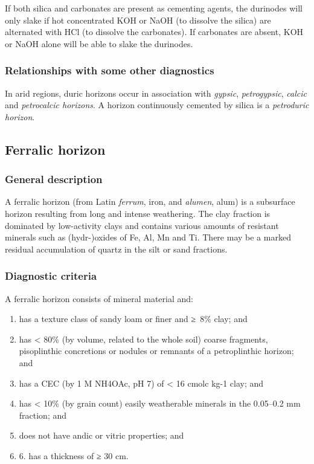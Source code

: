 \documentclass[
  letterpaper,
  DIV=11,
  numbers=noendperiod]{scrreprt}
\providecommand{\tightlist}{%
  \setlength{\itemsep}{0pt}\setlength{\parskip}{0pt}}\usepackage{longtable,booktabs,array}
\begin{document}
If both silica and carbonates are present as cementing agents, the
durinodes will only slake if hot concentrated KOH or NaOH (to dissolve
the silica) are alternated with HCl (to dissolve the carbonates). If
carbonates are absent, KOH or NaOH alone will be able to slake the
durinodes.

\hypertarget{relationships-with-some-other-diagnostics-8}{%
\subsubsection{Relationships with some other
diagnostics}\label{relationships-with-some-other-diagnostics-8}}

In arid regions, duric horizons occur in association with \emph{gypsic},
\emph{petrogypsic}, \emph{calcic} and \emph{petrocalcic horizons}. A
horizon continuously cemented by silica is a \emph{petroduric horizon}.

\hypertarget{ferralic-horizon}{%
\subsection{Ferralic horizon}\label{ferralic-horizon}}

\hypertarget{general-description-9}{%
\subsubsection{General description}\label{general-description-9}}

A ferralic horizon (from Latin \emph{ferrum}, iron, and \emph{alumen},
alum) is a subsurface horizon resulting from long and intense
weathering. The clay fraction is dominated by low-activity clays and
contains various amounts of resistant minerals such as (hydr-)oxides of
Fe, Al, Mn and Ti. There may be a marked residual accumulation of quartz
in the silt or sand fractions.

\hypertarget{diagnostic-criteria-9}{%
\subsubsection{Diagnostic criteria}\label{diagnostic-criteria-9}}

A ferralic horizon consists of mineral material and:

\begin{enumerate}
\def\labelenumi{\arabic{enumi}.}
\tightlist
\item
  has a texture class of sandy loam or finer and ≥~8\% clay; and
\item
  has \textless{} 80\% (by volume, related to the whole soil) coarse
  fragments, pisoplinthic concretions or nodules or remnants of a
  petroplinthic horizon; and
\item
  has a CEC (by 1 M NH4OAc, pH 7) of \textless{} 16 cmolc kg-1 clay; and
\item
  has \textless{} 10\% (by grain count) easily weatherable minerals in
  the 0.05--0.2 mm fraction; and
\item
  does not have andic or vitric properties; and
\item
  6. has a thickness of ≥ 30 cm.
\end{enumerate}
\end{document}
